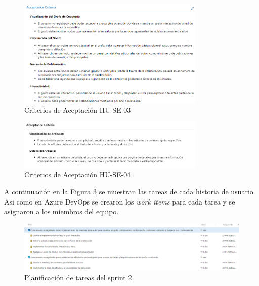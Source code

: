 \begin{figure}[H]
    \centering
    \includegraphics[width=0.8\textwidth]{../02Figures/02Chapter/Sprints/Sprint-2/aceptance-criteria-HU-SE-03.png}
    \caption{Criterios de Aceptación HU-SE-03}
    \label{C2F2:Criterios de Aceptacion HU-SE-03}
\end{figure}

\begin{figure}[H]
    \centering
    \includegraphics[width=0.8\textwidth]{../02Figures/02Chapter/Sprints/Sprint-2/aceptance-criteria-HU-SE-04.png}
    \caption{Criterios de Aceptación HU-SE-04}
    \label{C2F2:Criterios de Aceptacion HU-SE-04}
\end{figure}

A continuación en la Figura \ref{fig:azure-board-sprint-2} se muestran las tareas de cada historia de usuario. Asi como en  Azure DevOps se crearon los \textit{work items} para cada tarea y se asignaron a los miembros del equipo.

\begin{figure}[H]
    \centering
    \includegraphics[width=1\textwidth]{../02Figures/02Chapter/Sprints/Sprint-2/fig_azure-board-sprint-2.png}
    \caption{Planificación de tareas del sprint 2}
    \label{fig:azure-board-sprint-2}
\end{figure}


